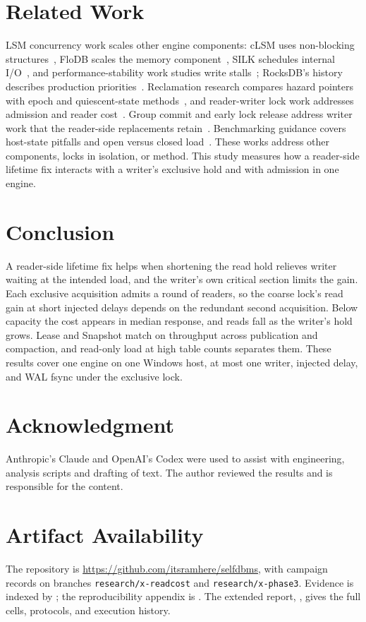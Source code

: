 \documentclass[conference]{IEEEtran}
\begin{document}
\section{Related Work}
LSM concurrency work scales other engine components: cLSM uses non-blocking structures~\cite{golan2015}, FloDB scales the memory component~\cite{flodb2017}, SILK schedules internal I/O~\cite{balmau2019}, and performance-stability work studies write stalls~\cite{luo2019}; RocksDB's history describes production priorities~\cite{dong2021}. Reclamation research compares hazard pointers with epoch and quiescent-state methods~\cite{michael2004,hart2007}, and reader-writer lock work addresses admission and reader cost~\cite{mellor1991,brandenburg2009,calciu2013,liu2014,bravo2019}. Group commit and early lock release address writer work that the reader-side replacements retain~\cite{dewitt1984,aether2010}. Benchmarking guidance covers host-state pitfalls and open versus closed load~\cite{georges2007,hoefler2015,traeger2008,schroeder2006}. These works address other components, locks in isolation, or method. This study measures how a reader-side lifetime fix interacts with a writer's exclusive hold and with admission in one engine.

\section{Conclusion}
A reader-side lifetime fix helps when shortening the read hold relieves writer waiting at the intended load, and the writer's own critical section limits the gain. Each exclusive acquisition admits a round of readers, so the coarse lock's read gain at short injected delays depends on the redundant second acquisition. Below capacity the cost appears in median response, and reads fall as the writer's hold grows. Lease and Snapshot match on throughput across publication and compaction, and read-only load at high table counts separates them. These results cover one engine on one Windows host, at most one writer, injected delay, and WAL fsync under the exclusive lock.

\section*{Acknowledgment}
Anthropic's Claude and OpenAI's Codex were used to assist with engineering, analysis scripts and drafting of text. The author reviewed the results and is responsible for the content.
\section*{Artifact Availability}
The repository is \url{https://github.com/itsramhere/selfdbms}, with campaign records on branches \texttt{research/x-readcost} and \texttt{research/x-phase3}. Evidence is indexed by ; the reproducibility appendix is . The extended report, , gives the full cells, protocols, and execution history.
\end{document}

